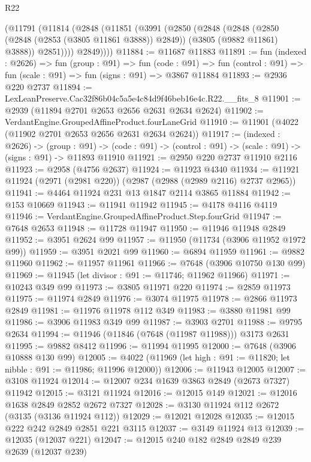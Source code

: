 \begin{lexlean}{R22}
\begin{coremodule}
      (@11791
        (@11814
          (@2848
            (@11851
              (@3991
                (@2850
                  (@2848
                    (@2848
                      (@2850 (@2848 (@2853 (@3805 @11861 @3888)) @2849))
                      (@3805 (@9882 @11861) @3888))
                    @2851))))
            @2849))))
@11884 := @11687 @11883
@11891 := fun (indexed : @2626) =>
  fun (group : @91) =>
  fun (code : @91) => fun (control : @91) => fun (scale : @91) => fun (signs : @91) => @3867 @11884
@11893 := @2936 @220 @2737
@11894 := LexLeanPreserve.Cac32f86b04c5a5e4c84d9f46beb16e4c.R22.__fits_8
@11901 := @2939 (@11894 @2701 @2653 @2656 @2631 @2634 @2624)
@11902 := VerdantEngine.GroupedAffineProduct.fourLaneGrid
@11910 := @11901 (@4022 (@11902 @2701 @2653 @2656 @2631 @2634 @2624))
@11917 := (indexed : @2626) ->
  (group : @91) ->
  (code : @91) -> (control : @91) -> (scale : @91) -> (signs : @91) -> @11893 @11910
@11921 := @2950 @220 @2737 @11910 @2116
@11923 := @2958 (@4756 @2637)
@11924 := @11923 @4340
@11934 := @11921 @11924 (@2971 (@2981 @220)) (@2987 (@2988 (@2989 @2116) @2737 @2965))
@11941 := @4464 @11924 @231 @13 @1847 @2114 @3865 @11884
@11942 := @153 @10669
@11943 := @11941 @11942
@11945 := @4178 @4116 @4119
@11946 := VerdantEngine.GroupedAffineProduct.Step.fourGrid
@11947 := @7648 @2653
@11948 := @11728 @11947
@11950 := @11946 @11948 @2849
@11952 := @3951 @2624 @99
@11957 := @11950 (@11734 (@3906 @11952 @1972 @99))
@11959 := @3951 @2021 @99
@11960 := @6894 @11959
@11961 := @9882 @11960
@11962 := @11957 @11961
@11966 := @7648 (@3906 @10750 @130 @99)
@11969 := @11945 (let divisor : @91 := @11746; @11962 @11966)
@11971 := @10243 @349 @99
@11973 := @3805 @11971 @220
@11974 := @2859 @11973
@11975 := @11974 @2849
@11976 := @3074 @11975
@11978 := @2866 @11973 @2849
@11981 := @11976 @11978 @112 @349
@11983 := @3880 @11981 @99
@11986 := @3906 @11983 @349 @99
@11987 := @3903 @2701
@11988 := @9795 @2634
@11994 := @11946 (@11846 (@7648 (@11987 @11988))) @3173 @2631
@11995 := @9882 @8412
@11996 := @11994 @11995
@12000 := @7648 (@3906 @10888 @130 @99)
@12005 := @4022 (@11969 (let high : @91 := @11820; let nibble : @91 := @11986; @11996 @12000))
@12006 := @11943 @12005
@12007 := @3108 @11924
@12014 := @12007 @234 @1639 @3863 @2849 (@2673 @7327) @11942
@12015 := @3121 @11924
@12016 := @12015 @149
@12021 := @12016 @1638 @2849 @2852 @2672 @7327
@12028 := @3130 @11924 @112 @2672 (@3135 (@3136 @11924 @112))
@12029 := @12021 @12028
@12035 := @12015 @222 @242 @2849 @2851 @221 @3115
@12037 := @3149 @11924 @13
@12039 := @12035 (@12037 @221)
@12047 := @12015 @240 @182 @2849 @2849 @239 @2639 (@12037 @239)

\end{coremodule}
\end{lexlean}
